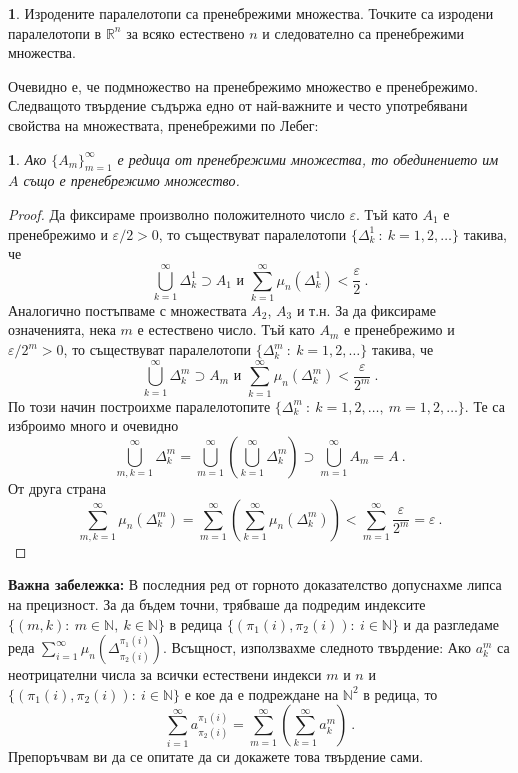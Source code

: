 \documentclass[11pt]{article}
\numberwithin{equation}{section}
\numberwithin{figure}{section}
\numberwithin{table}{section}
\theoremstyle{plain}
\theoremstyle{definition}
\theoremstyle{remark}
\theoremstyle{definition}
\theoremstyle{remark}
\theoremstyle{plain}
\theoremstyle{definition}
\theoremstyle{definition}
\newtheorem{example}[thm]{\protect\examplename}
\theoremstyle{plain}
\theoremstyle{plain}
\newtheorem{prop}[thm]{\protect\propositionname}
\theoremstyle{plain}
\theoremstyle{definition}
\theoremstyle{plain}
\providecommand{\examplename}{Пример}
\providecommand{\propositionname}{Твърдение}
\newcommand*{\R}{\mathbb{R}}
\newcommand*{\N}{\mathbb{N}}
\begin{document}
\begin{example}
Изродените паралелотопи са пренебрежими множества.
Точките са изродени паралелотопи в $\R^n$ за всяко естествено $n$ и следователно са пренебрежими множества.
\end{example}

Очевидно е, че подмножество на пренебрежимо множество е пренебрежимо. Следващото твърдение съдържа едно от най-важните и често употребявани свойства на множествата, пренебрежими по Лебег:
\begin{prop}
Ако $\{A_m\}_{m=1}^\infty$ е редица от пренебрежими множества, то обединението им $A$ също е пренебрежимо множество.
\end{prop}

\begin{proof} Да фиксираме произволно положителното число $\varepsilon$. Тъй като $A_1$ е пренебрежимо и $\varepsilon/2 >0$, то съществуват паралелотопи $\{ \Delta^1_k \ : \ k=1,2, \dots \}$ такива, че 
$$\bigcup_{k=1}^\infty \Delta_k^1 \supset A_1  \mbox{ и } \sum_{k=1}^\infty \mu_n(\Delta_k^1)<\frac{\varepsilon}{2} \ .$$
Аналогично постъпваме с множествата $A_2$, $A_3$ и т.н. За да фиксираме означенията, нека $m$ е естествено число. Тъй като $A_m$ е пренебрежимо и $\varepsilon/2^m >0$, то съществуват паралелотопи $\{ \Delta^m_k \ : \ k=1,2, \dots \}$ такива, че
$$\bigcup_{k=1}^\infty \Delta_k^m \supset A_m  \mbox{ и } \sum_{k=1}^\infty \mu_n(\Delta_k^m)<\frac{\varepsilon}{2^m} \ .$$
По този начин построихме паралелотопите $\{ \Delta^m_k \ : \ k=1,2, \dots , \ m=1, 2, \dots\}$. Те са изброимо много и очевидно
$$\bigcup_{m,k=1}^\infty \Delta^m_k =\bigcup_{m=1}^\infty \left( \bigcup_{k=1}^\infty \Delta^m_k\right)\supset 
\bigcup_{m=1}^\infty A_m = A \ .$$
От друга страна
$$\sum_{m,k=1}^\infty \mu_n\left(\Delta^m_k \right)=\sum_{m=1}^\infty \left( \sum_{k=1}^\infty \mu_n\left(\Delta^m_k \right)\right)< 
\sum_{m=1}^\infty \frac{\varepsilon}{2^m} = \varepsilon \ .$$
\end{proof}


\textbf{Важна забележка:} В последния ред от горното доказателство допуснахме липса на прецизност. За да бъдем точни, трябваше да подредим индексите $\{ (m,k): \ m\in \N, \ k\in \N\}$  в редица $\{ (\pi_1 (i), \pi_2(i)) : \ i\in \N \}$ и да разгледаме реда $\sum_{i=1}^\infty \mu_n\left(\Delta^{\pi_1 (i)}_{\pi_2(i)} \right)$. Всъщност, използвахме следното твърдение: Ако $a^m_k$ са неотрицателни числа за всички естествени индекси $m$ и $n$ и $\{ (\pi_1 (i), \pi_2(i)) : \ i\in \N \}$ е кое да е подреждане на $\N^2$ в редица, то
$$\sum_{i=1}^\infty a^{\pi_1 (i)}_{\pi_2(i)} =\sum_{m=1}^\infty \left( \sum_{k=1}^\infty a^m_k\right) \ .$$
Препоръчвам ви да се опитате да си докажете това твърдение сами.
\end{document}
